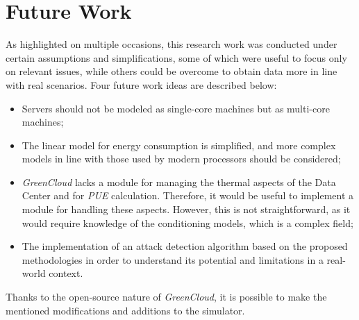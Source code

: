 \section{Future Work}
As highlighted on multiple occasions, this research work was conducted under certain assumptions and simplifications, some of which were useful to focus only on relevant issues, while others could be overcome to obtain data more in line with real scenarios. Four future work ideas are described below:
\begin{itemize}
\item Servers should not be modeled as single-core machines but as multi-core machines;
\item The linear model for energy consumption is simplified, and more complex models in line with those used by modern processors should be considered;
\item \emph{GreenCloud} lacks a module for managing the thermal aspects of the Data Center and for \emph{PUE} calculation. Therefore, it would be useful to implement a module for handling these aspects. However, this is not straightforward, as it would require knowledge of the conditioning models, which is a complex field;
\item The implementation of an attack detection algorithm based on the proposed methodologies in order to understand its potential and limitations in a real-world context.
\end{itemize}
Thanks to the open-source nature of \emph{GreenCloud}, it is possible to make the mentioned modifications and additions to the simulator. 